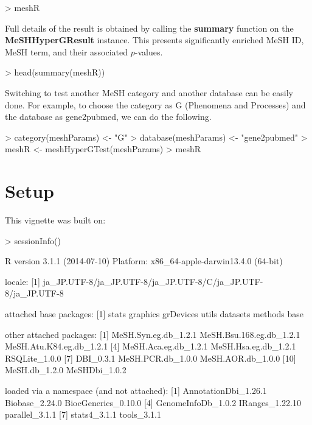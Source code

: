 \documentclass[11pt]{article}
\begin{document}
\begin{center}
\begin{Schunk}
\begin{Sinput}
> meshR
\end{Sinput}
\end{Schunk}
\end{center}

Full details of the result is obtained by calling the \textbf{summary} function on the \textbf{MeSHHyperGResult} instance.
This presents significantly enriched MeSH ID, MeSH term, and their associated $p$-values.

\begin{center}
\begin{Schunk}
\begin{Sinput}
> head(summary(meshR))
\end{Sinput}
\end{Schunk}
\end{center}

Switching to test another MeSH category and another database can be easily done.
For example, to choose the category as G (Phenomena and Processes) and the database as gene2pubmed, we can do the following.

\begin{center}
\begin{Schunk}
\begin{Sinput}
> category(meshParams) <- "G"
> database(meshParams) <- "gene2pubmed"
> meshR <- meshHyperGTest(meshParams)
> meshR
\end{Sinput}
\end{Schunk}
\end{center}

\clearpage
\section{Setup}

This vignette was built on:
\begin{Schunk}
\begin{Sinput}
> sessionInfo()
\end{Sinput}
\begin{Soutput}
R version 3.1.1 (2014-07-10)
Platform: x86_64-apple-darwin13.4.0 (64-bit)

locale:
[1] ja_JP.UTF-8/ja_JP.UTF-8/ja_JP.UTF-8/C/ja_JP.UTF-8/ja_JP.UTF-8

attached base packages:
[1] stats     graphics  grDevices utils     datasets  methods   base     

other attached packages:
 [1] MeSH.Syn.eg.db_1.2.1     MeSH.Bsu.168.eg.db_1.2.1 MeSH.Atu.K84.eg.db_1.2.1
 [4] MeSH.Aca.eg.db_1.2.1     MeSH.Hsa.eg.db_1.2.1     RSQLite_1.0.0           
 [7] DBI_0.3.1                MeSH.PCR.db_1.0.0        MeSH.AOR.db_1.0.0       
[10] MeSH.db_1.2.0            MeSHDbi_1.0.2           

loaded via a namespace (and not attached):
[1] AnnotationDbi_1.26.1 Biobase_2.24.0       BiocGenerics_0.10.0 
[4] GenomeInfoDb_1.0.2   IRanges_1.22.10      parallel_3.1.1      
[7] stats4_3.1.1         tools_3.1.1         
\end{Soutput}
\end{Schunk}
\end{document}
